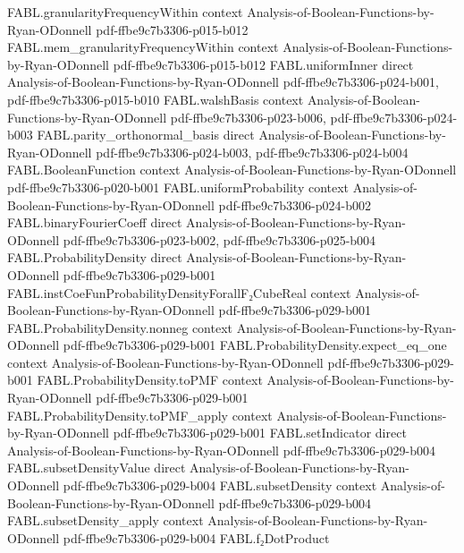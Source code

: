 \begin{theorem}
  {FABL.granularityFrequencyWithin}
  {context}
  {Analysis-of-Boolean-Functions-by-Ryan-ODonnell}
  {pdf-ffbe9c7b3306-p015-b012}
\proofstep
  {FABL.mem_granularityFrequencyWithin}
  {context}
  {Analysis-of-Boolean-Functions-by-Ryan-ODonnell}
  {pdf-ffbe9c7b3306-p015-b012}
\proofstep
  {FABL.uniformInner}
  {direct}
  {Analysis-of-Boolean-Functions-by-Ryan-ODonnell}
  {pdf-ffbe9c7b3306-p024-b001,
    pdf-ffbe9c7b3306-p015-b010}
\proofstep
  {FABL.walshBasis}
  {context}
  {Analysis-of-Boolean-Functions-by-Ryan-ODonnell}
  {pdf-ffbe9c7b3306-p023-b006,
    pdf-ffbe9c7b3306-p024-b003}
\proofstep
  {FABL.parity_orthonormal_basis}
  {direct}
  {Analysis-of-Boolean-Functions-by-Ryan-ODonnell}
  {pdf-ffbe9c7b3306-p024-b003,
    pdf-ffbe9c7b3306-p024-b004}
\proofstep
  {FABL.BooleanFunction}
  {context}
  {Analysis-of-Boolean-Functions-by-Ryan-ODonnell}
  {pdf-ffbe9c7b3306-p020-b001}
\proofstep
  {FABL.uniformProbability}
  {context}
  {Analysis-of-Boolean-Functions-by-Ryan-ODonnell}
  {pdf-ffbe9c7b3306-p024-b002}
\proofstep
  {FABL.binaryFourierCoeff}
  {direct}
  {Analysis-of-Boolean-Functions-by-Ryan-ODonnell}
  {pdf-ffbe9c7b3306-p023-b002,
    pdf-ffbe9c7b3306-p025-b004}
\proofstep
  {FABL.ProbabilityDensity}
  {direct}
  {Analysis-of-Boolean-Functions-by-Ryan-ODonnell}
  {pdf-ffbe9c7b3306-p029-b001}
\proofstep
  {FABL.instCoeFunProbabilityDensityForallF₂CubeReal}
  {context}
  {Analysis-of-Boolean-Functions-by-Ryan-ODonnell}
  {pdf-ffbe9c7b3306-p029-b001}
\proofstep
  {FABL.ProbabilityDensity.nonneg}
  {context}
  {Analysis-of-Boolean-Functions-by-Ryan-ODonnell}
  {pdf-ffbe9c7b3306-p029-b001}
\proofstep
  {FABL.ProbabilityDensity.expect_eq_one}
  {context}
  {Analysis-of-Boolean-Functions-by-Ryan-ODonnell}
  {pdf-ffbe9c7b3306-p029-b001}
\proofstep
  {FABL.ProbabilityDensity.toPMF}
  {context}
  {Analysis-of-Boolean-Functions-by-Ryan-ODonnell}
  {pdf-ffbe9c7b3306-p029-b001}
\proofstep
  {FABL.ProbabilityDensity.toPMF_apply}
  {context}
  {Analysis-of-Boolean-Functions-by-Ryan-ODonnell}
  {pdf-ffbe9c7b3306-p029-b001}
\proofstep
  {FABL.setIndicator}
  {direct}
  {Analysis-of-Boolean-Functions-by-Ryan-ODonnell}
  {pdf-ffbe9c7b3306-p029-b004}
\proofstep
  {FABL.subsetDensityValue}
  {direct}
  {Analysis-of-Boolean-Functions-by-Ryan-ODonnell}
  {pdf-ffbe9c7b3306-p029-b004}
\proofstep
  {FABL.subsetDensity}
  {context}
  {Analysis-of-Boolean-Functions-by-Ryan-ODonnell}
  {pdf-ffbe9c7b3306-p029-b004}
\proofstep
  {FABL.subsetDensity_apply}
  {context}
  {Analysis-of-Boolean-Functions-by-Ryan-ODonnell}
  {pdf-ffbe9c7b3306-p029-b004}
\proofstep
  {FABL.f₂DotProduct}

\end{theorem}
